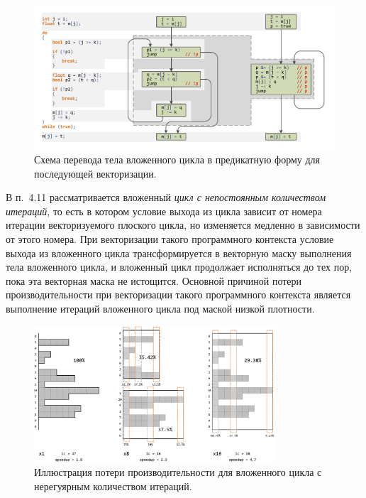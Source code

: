 \documentclass[a4paper,14pt]{extarticle}                     %
\theoremstyle{plain}                                         %
\begin{document}
\begin{figure}[ht]
\centering
\includegraphics[width=1.0\textwidth]{./pics/text_4_vec_irreg/shell_cfg.pdf}
\singlespacing
{}\caption{Схема перевода тела вложенного цикла в предикатную форму для последующей векторизации.}
\label{fig:text_4_vec_irreg_shell_cfg}
\end{figure}

В п.~4.11 рассматривается вложенный \textit{цикл с непостоянным количеством итераций}, то есть в котором условие выхода из цикла зависит от номера итерации векторизуемого плоского цикла, но изменяется медленно в зависимости от этого номера.
При векторизации такого программного контекста условие выхода из вложенного цикла трансформируется в векторную маску выполнения тела вложенного цикла, и вложенный цикл продолжает исполняться до тех пор, пока эта векторная маска не истощится.
Основной причиной потери производительности при векторизации такого программного контекста является выполнение итераций вложенного цикла под маской низкой плотности.

\begin{figure}[!ht]
\centering
\includegraphics[width=0.8\textwidth]{./pics/text_4_vec_irreg/pack.png}
\singlespacing
{}\caption{Иллюстрация потери производительности для вложенного цикла с нерегуярным количеством итераций.}
\label{fig:text_4_vec_irreg_pack}
\end{figure}
\end{document}
